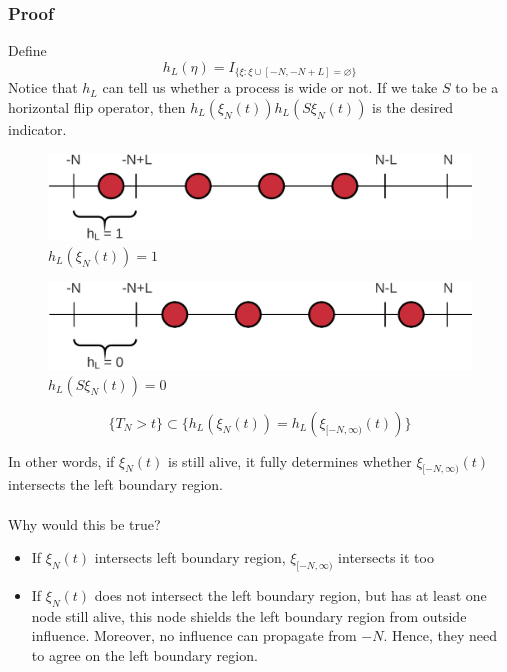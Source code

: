 \documentclass{beamer}
\begin{document}
\begin{frame}
    \frametitle{Proof}
    Define \[h_L(\eta) = I_{\{\xi : \xi \cup [-N, -N+L] = \varnothing\}}\]
    Notice that $h_L$ can tell us whether a process is wide or not.
    If we take $S$ to be a horizontal flip operator, then $h_L(\xi_N(t))h_L(S\xi_N(t))$ is the desired indicator.
    \begin{figure}[H]
        \centering
        \includegraphics[scale=0.15]{./img/narrow_flip_ex_1.png}
        \caption{$h_L(\xi_N(t)) = 1$}
        \label{fig:narrow_flip_1}
    \end{figure}
    \begin{figure}[H]
        \centering
        \includegraphics[scale=0.15]{./img/narrow_flip_ex_2.png}
        \caption{$h_L(S\xi_N(t)) = 0$}
        \label{fig:narrow_flip_2}
    \end{figure}

\end{frame}

\begin{frame}
    \begin{lemma}
        \[\{T_N > t\} \subset \{h_L(\xi_N(t)) = h_L(\xi_{[-N, \infty)}(t))\}\]
    \end{lemma}
    In other words, if $\xi_N(t)$ is still alive, it fully determines whether $\xi_{[-N, \infty)}(t)$ intersects the left boundary region.
    \\~\\
    Why would this be true?
    \begin{itemize}
        \item If $\xi_N(t)$ intersects left boundary region, $\xi_{[-N, \infty)}$ intersects it too
        \item If $\xi_N(t)$ does not intersect the left boundary region, but has at least one node still alive, this node shields the left boundary region from outside influence.
            Moreover, no influence can propagate from $-N$. Hence, they need to agree on the left boundary region.
    \end{itemize}
\end{frame}
\end{document}
